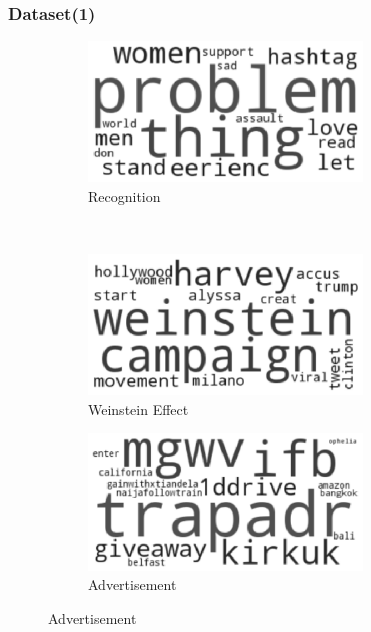 \documentclass{beamer}
\begin{document}
\begin{frame}
\frametitle{Dataset(1)}
\begin{figure}[h]
\centering
\begin{subfigure}{0.45\textwidth}
\includegraphics[width=0.8\textwidth]{SS61.eps}
\centering
\caption{Recognition}
\end{subfigure}\pause
~
\begin{subfigure}{0.45\textwidth}
\includegraphics[width=0.8\textwidth]{SS62.eps}
\centering
\caption{Weinstein Effect}
\end{subfigure}\pause

\begin{subfigure}{0.45\textwidth}
\includegraphics[width=0.8\textwidth]{SS63.eps}
\centering
\caption{Advertisement}
\end{subfigure}
\end{figure}
\end{frame}
\end{document}
